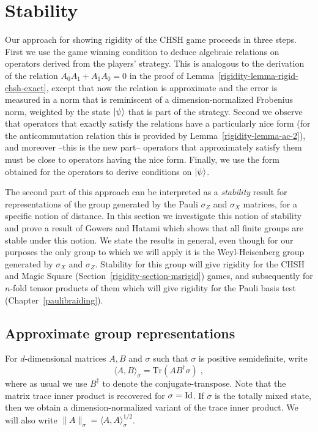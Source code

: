 \section{Stability}
\label{section-stability}

Our approach for showing rigidity of the CHSH game proceeds in three steps. First we use the game winning condition to deduce algebraic relations on operators derived from the players' strategy. This is analogous to the derivation of the relation $A_0A_1+A_1A_0=0$ in the proof of Lemma~\ref{rigidity-lemma-rigid-chsh-exact}, except that now the relation is approximate and the error is measured in a norm that is reminiscent of a dimension-normalized Frobenius norm, weighted by the state $|\psi\rangle$ that is part of the strategy. Second we observe that operators that exactly satisfy the relations have a particularly nice form (for the anticommutation relation this is provided by Lemma~\ref{rigidity-lemma-ac-2}), and moreover --this is the new part-- operators that approximately satisfy them must be close to operators having the nice form. Finally, we use the form obtained for the operators to derive conditions on $|\psi\rangle$. 

The second part of this approach can be interpreted as a \emph{stability} result for representations of the group generated by the Pauli $\sigma_Z$ and $\sigma_X$ matrices, for a specific notion of distance. In this section we investigate this notion of stability and prove a result of Gowers and Hatami which shows that all finite groups are stable under this notion. We state the results in general, even though for our purposes the only group to which we will apply it is the Weyl-Heisenberg group generated by $\sigma_X$ and $\sigma_Z$. Stability for this group  will give rigidity for the CHSH and Magic Square (Section~\ref{rigidity-section-msrigid}) games, and subsequently for $n$-fold tensor products of them which will give rigidity for the Pauli basis test (Chapter~\ref{paulibraiding}).


\subsection{Approximate group representations}
\label{subsection-approxrep}

For $d$-dimensional matrices  $A,B$ and $\sigma$ such that $\sigma$ is positive semidefinite, write 
$$\langle A,B\rangle_\sigma = \mathrm{Tr}(AB^\dagger \sigma)\;,$$
where as usual we use $B^\dagger$ to denote the conjugate-transpose. Note that the matrix trace inner product is recovered for $\sigma = \mathop{\rm Id}\nolimits$. If $\sigma$ is the totally mixed state, then we obtain a dimension-normalized variant of the trace inner product. We will also write $\|A\|_\sigma = \langle A,A\rangle_\sigma^{1/2}$. 

